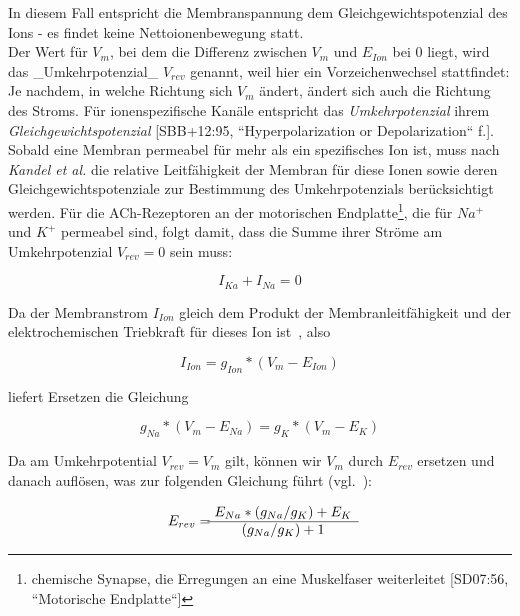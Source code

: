 {{In diesem Fall entspricht die Membranspannung dem Gleichgewichtspotenzial des Ions - es findet keine Nettoionenbewegung statt.\\

Der Wert für $V_m$, bei dem die Differenz zwischen $V_m$ und $E_{Ion}$ bei $0$ liegt, wird das _Umkehrpotenzial_ $V_{rev}$ genannt, weil hier ein Vorzeichenwechsel stattfindet: Je nachdem, in welche Richtung sich $V_m$ ändert, ändert sich auch die Richtung des Stroms. 
Für ionenspezifische Kanäle entspricht das \textit{Umkehrpotenzial} ihrem \textit{Gleichgewichtspotenzial} [SBB+12:95, ``Hyperpolarization or Depolarization`` f.].\\

Sobald eine Membran permeabel für mehr als ein spezifisches Ion ist, muss nach \textit{Kandel et al.} die relative Leitfähigkeit der Membran für diese Ionen sowie deren Gleichgewichtspotenziale zur Bestimmung des Umkehrpotenzials berücksichtigt werden.
Für die ACh-Rezeptoren an der motorischen Endplatte\footnote{
 chemische Synapse, die Erregungen an eine Muskelfaser weiterleitet [SD07:56, ``Motorische Endplatte``]
}, die für $Na^+$ und $K^+$ permeabel sind, folgt damit, dass die Summe ihrer Ströme am Umkehrpotenzial $V_{rev} = 0$ sein muss:

\begin{equation}
I_{Ka} + I_{Na} = 0
\end{equation}

Da der Membranstrom $I_{Ion}$ gleich dem Produkt der Membranleitfähigkeit und der elektrochemischen Triebkraft für dieses Ion ist~\cite[93]{BCP18}, also

\begin{equation}
I_{Ion} = g_{Ion} * (V_m - E_{Ion})
\end{equation}

liefert Ersetzen die Gleichung

\begin{equation}
g_{Na} * (V_m - E_{Na}) = g_{K} * (V_m - E_{K})
\end{equation}

Da am Umkehrpotential $V_{rev} = V_m$ gilt, können wir $V_m$ durch $E_{rev}$ ersetzen und danach auflösen, was zur folgenden Gleichung führt (vgl.~\cite[196, Box 9-1]{KSJ+13}):

\begin{equation}
E_{rev} = \begin{matrix}
            E_{Na} \space * \space (g_{Na} \space / \space g_{K}) \space + \space E_{K}  \\ \hline
            (g_{Na} \space / \space g_{K}) \space + 1
\end{matrix}
\end{equation}

}}
